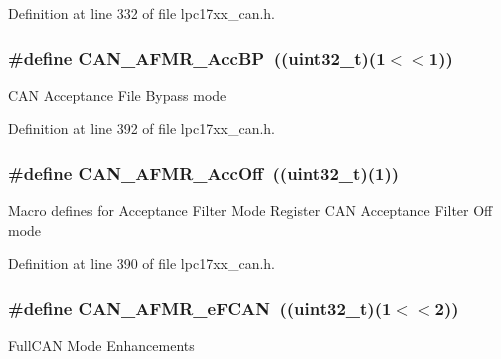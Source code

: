 \-Definition at line 332 of file lpc17xx\-\_\-can.\-h.

\hypertarget{group___c_a_n___private___macros_ga5898b392a8238963da2b27a56c5cfa01}{
\subsubsection[{\-C\-A\-N\-\_\-\-A\-F\-M\-R\-\_\-\-Acc\-B\-P}]{\setlength{\rightskip}{0pt plus 5cm}\#define {\bf \-C\-A\-N\-\_\-\-A\-F\-M\-R\-\_\-\-Acc\-B\-P}~((uint32\-\_\-t)(1$<$$<$1))}}\label{group___c_a_n___private___macros_ga5898b392a8238963da2b27a56c5cfa01}
\-C\-A\-N \-Acceptance \-File \-Bypass mode 

\-Definition at line 392 of file lpc17xx\-\_\-can.\-h.

\hypertarget{group___c_a_n___private___macros_gac7547bc4c5373df98d6c78eba6e5b19a}{
\subsubsection[{\-C\-A\-N\-\_\-\-A\-F\-M\-R\-\_\-\-Acc\-Off}]{\setlength{\rightskip}{0pt plus 5cm}\#define {\bf \-C\-A\-N\-\_\-\-A\-F\-M\-R\-\_\-\-Acc\-Off}~((uint32\-\_\-t)(1))}}\label{group___c_a_n___private___macros_gac7547bc4c5373df98d6c78eba6e5b19a}
\-Macro defines for \-Acceptance \-Filter \-Mode \-Register \-C\-A\-N \-Acceptance \-Filter \-Off mode 

\-Definition at line 390 of file lpc17xx\-\_\-can.\-h.

\hypertarget{group___c_a_n___private___macros_ga1644f1f446eeb4491a5da909000701b2}{
\subsubsection[{\-C\-A\-N\-\_\-\-A\-F\-M\-R\-\_\-e\-F\-C\-A\-N}]{\setlength{\rightskip}{0pt plus 5cm}\#define {\bf \-C\-A\-N\-\_\-\-A\-F\-M\-R\-\_\-e\-F\-C\-A\-N}~((uint32\-\_\-t)(1$<$$<$2))}}\label{group___c_a_n___private___macros_ga1644f1f446eeb4491a5da909000701b2}
\-Full\-C\-A\-N \-Mode \-Enhancements 

